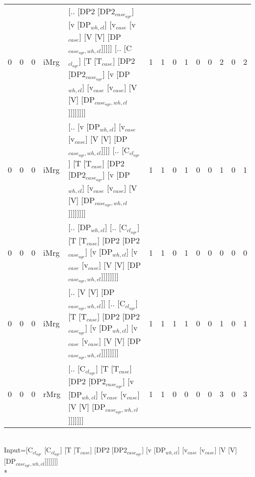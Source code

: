 \begin{tabularx}{\linewidth}{rrrlXrrrrrrrrr}
   0 &       0 &   0 & iMrg & [.. [DP2 [DP2$_{case_{agr}}$] [v [DP$_{wh,cl}$] [v$_{case}$ [v$_{case}$] [V [V] [DP$_{case_{agr},wh,cl}$]]]]] [.. [C$_{cl_{agr}}$] [T [T$_{case}$] [DP2 [DP2$_{case_{agr}}$] [v [DP$_{wh,cl}$] [v$_{case}$ [v$_{case}$] [V [V] [DP$_{case_{agr},wh,cl}$]]]]]]]]              &             1 &             1 &                  0 &            1 &              0 &             0 &        2 &             0 &        2 \\
   0 &       0 &   0 & iMrg & [.. [v [DP$_{wh,cl}$] [v$_{case}$ [v$_{case}$] [V [V] [DP$_{case_{agr},wh,cl}$]]]] [.. [C$_{cl_{agr}}$] [T [T$_{case}$] [DP2 [DP2$_{case_{agr}}$] [v [DP$_{wh,cl}$] [v$_{case}$ [v$_{case}$] [V [V] [DP$_{case_{agr},wh,cl}$]]]]]]]]                                   &             1 &             1 &                  0 &            1 &              0 &             0 &        1 &             0 &        1 \\
   0 &       0 &   0 & iMrg & [.. [DP$_{wh,cl}$] [.. [C$_{cl_{agr}}$] [T [T$_{case}$] [DP2 [DP2$_{case_{agr}}$] [v [DP$_{wh,cl}$] [v$_{case}$ [v$_{case}$] [V [V] [DP$_{case_{agr},wh,cl}$]]]]]]]]                                                                                     &             1 &             1 &                  0 &            1 &              0 &             0 &        0 &             0 &        0 \\
   0 &       0 &   0 & iMrg & [.. [V [V] [DP$_{case_{agr},wh,cl}$]] [.. [C$_{cl_{agr}}$] [T [T$_{case}$] [DP2 [DP2$_{case_{agr}}$] [v [DP$_{wh,cl}$] [v$_{case}$ [v$_{case}$] [V [V] [DP$_{case_{agr},wh,cl}$]]]]]]]]                                                                    &             1 &             1 &                  1 &            1 &              0 &             0 &        1 &             0 &        1 \\
   0 &       0 &   0 & rMrg & [.. [C$_{cl_{agr}}$] [T [T$_{case}$] [DP2 [DP2$_{case_{agr}}$] [v [DP$_{wh,cl}$] [v$_{case}$ [v$_{case}$] [V [V] [DP$_{case_{agr},wh,cl}$]]]]]]]                                                                                                     &             1 &             1 &                  0 &            0 &              0 &             0 &        3 &             0 &        3 \\
\hline
\end{tabularx}\endgroup\\
\begingroup\scriptsize Input=[C$_{cl_{agr}}$ [C$_{cl_{agr}}$] [T [T$_{case}$] [DP2 [DP2$_{case_{agr}}$] [v [DP$_{wh,cl}$] [v$_{case}$ [v$_{case}$] [V [V] [DP$_{case_{agr},wh,cl}$]]]]]]]\\*
